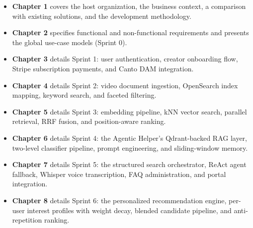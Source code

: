 \begin{itemize}
  \item \textbf{Chapter 1} covers the host organization, the business context, a comparison with existing solutions, and the development methodology.
  \item \textbf{Chapter 2} specifies functional and non-functional requirements and presents the global use-case models (Sprint 0).
  \item \textbf{Chapter 3} details Sprint 1: user authentication, creator onboarding flow, Stripe subscription payments, and Canto DAM integration.
  \item \textbf{Chapter 4} details Sprint 2: video document ingestion, OpenSearch index mapping, keyword search, and faceted filtering.
  \item \textbf{Chapter 5} details Sprint 3: embedding pipeline, kNN vector search, parallel retrieval, RRF fusion, and position-aware ranking.
  \item \textbf{Chapter 6} details Sprint 4: the Agentic Helper's Qdrant-backed RAG layer, two-level classifier pipeline, prompt engineering, and sliding-window memory.
  \item \textbf{Chapter 7} details Sprint 5: the structured search orchestrator, ReAct agent fallback, Whisper voice transcription, FAQ administration, and portal integration.
  \item \textbf{Chapter 8} details Sprint 6: the personalized recommendation engine, per-user interest profiles with weight decay, blended candidate pipeline, and anti-repetition ranking.
\end{itemize}
